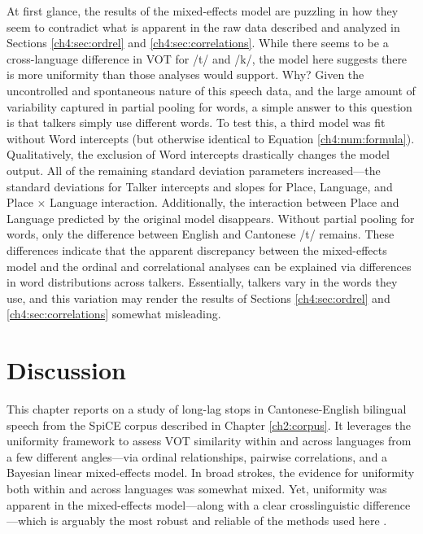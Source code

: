 At first glance, the results of the mixed-effects model are puzzling in how they seem to contradict what is apparent in the raw data described and analyzed in Sections \ref{ch4:sec:ordrel} and \ref{ch4:sec:correlations}. While there seems to be a cross-language difference in VOT for /t/ and /k/, the model here suggests there is more uniformity than those analyses would support. Why? Given the uncontrolled and spontaneous nature of this speech data, and the large amount of variability captured in partial pooling for words, a simple answer to this question is that talkers simply use different words. To test this, a third model was fit without Word intercepts (but otherwise identical to Equation \ref{ch4:num:formula}). Qualitatively, the exclusion of Word intercepts drastically changes the model output. All of the remaining standard deviation parameters increased---the standard deviations for Talker intercepts and slopes for Place, Language, and Place $\times$ Language interaction. Additionally, the interaction between Place and Language predicted by the original model disappears. Without partial pooling for words, only the difference between English and Cantonese /t/ remains. These differences indicate that the apparent discrepancy between the mixed-effects model and the ordinal and correlational analyses can be explained via differences in word distributions across talkers. Essentially, talkers vary in the words they use, and this variation may render the results of Sections \ref{ch4:sec:ordrel} and \ref{ch4:sec:correlations} somewhat misleading. 

\section{Discussion}\label{ch4:sec:discuss}

This chapter reports on a study of long-lag stops in Cantonese-English bilingual speech from the SpiCE corpus described in Chapter \ref{ch2:corpus}. It leverages the uniformity framework to assess VOT similarity within and across languages from a few different angles---via ordinal relationships, pairwise correlations, and a Bayesian linear mixed-effects model. In broad strokes, the evidence for uniformity both within and across languages was somewhat mixed. Yet, uniformity was apparent in the mixed-effects model---along with a clear crosslinguistic difference---which is arguably the most robust and reliable of the methods used here \citep{haines_2020_theoretically}. 

